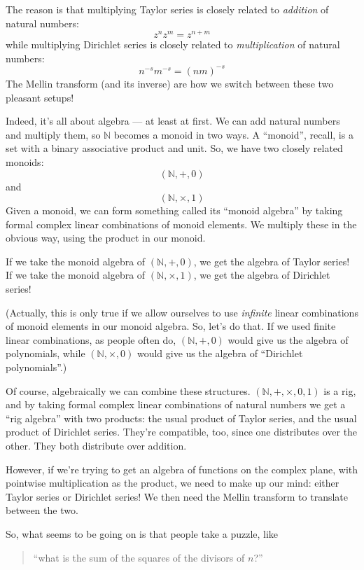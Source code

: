 \documentclass{article}
\begin{document}
The reason is that multiplying Taylor series is closely related to
\emph{addition} of natural numbers: \[z^n z^m = z^{n+m}\] while
multiplying Dirichlet series is closely related to \emph{multiplication}
of natural numbers: \[n^{-s} m^{-s} = (nm)^{-s}\] The Mellin transform
(and its inverse) are how we switch between these two pleasant setups!

Indeed, it's all about algebra --- at least at first. We can add natural
numbers and multiply them, so \(\mathbb{N}\) becomes a monoid in two
ways. A ``monoid'', recall, is a set with a binary associative product
and unit. So, we have two closely related monoids: \[(\mathbb{N},+,0)\]
and \[(\mathbb{N},\times,1)\] Given a monoid, we can form something
called its ``monoid algebra'' by taking formal complex linear
combinations of monoid elements. We multiply these in the obvious way,
using the product in our monoid.

If we take the monoid algebra of \((\mathbb{N},+,0)\), we get the
algebra of Taylor series! If we take the monoid algebra of
\((\mathbb{N},\times,1)\), we get the algebra of Dirichlet series!

(Actually, this is only true if we allow ourselves to use
\emph{infinite} linear combinations of monoid elements in our monoid
algebra. So, let's do that. If we used finite linear combinations, as
people often do, \((\mathbb{N},+,0)\) would give us the algebra of
polynomials, while \((\mathbb{N},\times,0)\) would give us the algebra
of ``Dirichlet polynomials''.)

Of course, algebraically we can combine these structures.
\((\mathbb{N},+,\times,0,1)\) is a rig, and by taking formal complex
linear combinations of natural numbers we get a ``rig algebra'' with two
products: the usual product of Taylor series, and the usual product of
Dirichlet series. They're compatible, too, since one distributes over
the other. They both distribute over addition.

However, if we're trying to get an algebra of functions on the complex
plane, with pointwise multiplication as the product, we need to make up
our mind: either Taylor series or Dirichlet series! We then need the
Mellin transform to translate between the two.

So, what seems to be going on is that people take a puzzle, like

\begin{quote}
``what is the sum of the squares of the divisors of \(n\)?''
\end{quote}
\end{document}
